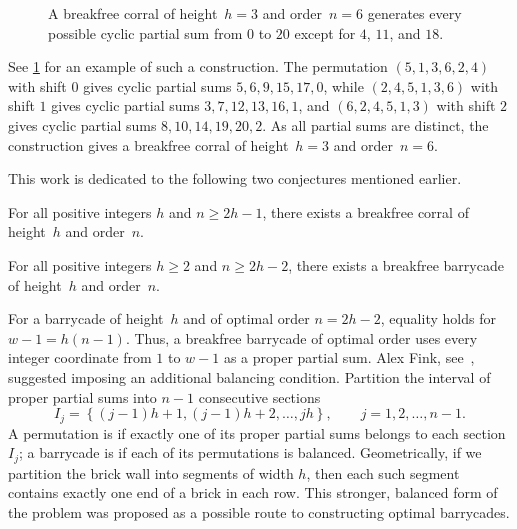 \documentclass[runningheads,envcountsame]{llncs}
\newcommand{\set}[1]{\left\{ #1 \right\}}
\let\ge\geqslant
\begin{document}
\begin{figure}[ht]
    \centering
    \caption{A breakfree corral of height~\(h=3\) and order~\(n=6\) generates every possible cyclic partial sum from $0$ to $20$ except for $4$, $11$, and $18$.}
    \label{fig:corral}
\end{figure}
See \cref{fig:corral} for an example of such a construction.
The permutation $(5, 1, 3,\allowbreak 6, 2, 4)$ with shift $0$ gives cyclic partial sums $5, 6, 9, 15, 17, 0$, while $(2,4,5,1,3,6)$ with shift $1$ gives cyclic partial sums $3, 7, 12, 13, 16, 1$, and $(6,\allowbreak 2,\allowbreak 4,\allowbreak 5,\allowbreak 1,\allowbreak 3)$ with shift $2$ gives cyclic partial sums $8, 10, 14, 19, 20, 2$.
As all partial sums are distinct, the construction gives a breakfree corral of height~$h=3$ and order~$n=6$.

This work is dedicated to the following two conjectures mentioned earlier.
\begin{conjecture}\label{cnj:corral}
    For all positive integers $h$ and $n\ge 2h-1$, there exists a breakfree corral of height~$h$ and order~$n$.
\end{conjecture}
\begin{conjecture}\label{cnj:barrycade}
    For all positive integers $h\ge2$ and $n\ge 2h-2$, there exists a breakfree barrycade of height~$h$ and order~$n$.
\end{conjecture}

For a barrycade of height~$h$ and of optimal order $n=2h-2$, equality holds for ${w-1=h(n-1)}$.
Thus, a breakfree barrycade of optimal order uses every integer coordinate from $1$ to $w-1$ as a proper partial sum.
Alex Fink, see~\cite{Guy2016,Guy2020}, suggested imposing an additional balancing condition.
Partition the interval of proper partial sums into $n-1$ consecutive sections
\begin{equation*}
    I_j=\set{(j-1)h+1,(j-1)h+2,\ldots,jh},
    \qquad j=1,2,\ldots,n-1.
\end{equation*}
A permutation is  if exactly one of its proper partial sums belongs to each section $I_j$; a barrycade is  if each of its permutations is balanced.
Geometrically, if we partition the brick wall into segments of width $h$, then each such segment contains exactly one end of a brick in each row.
This stronger, balanced form of the problem was proposed as a possible route to constructing optimal barrycades.
\end{document}
